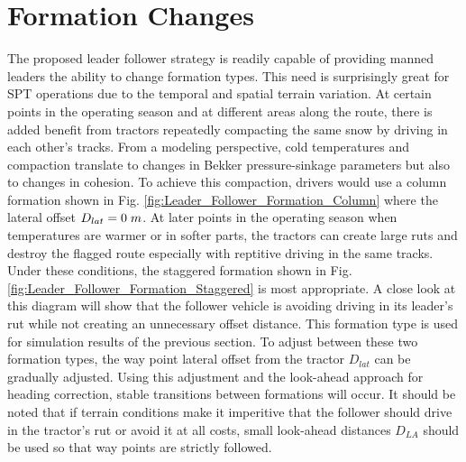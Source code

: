\section{Formation Changes}
The proposed leader follower strategy is readily capable of providing manned leaders the ability to change formation types. This need is surprisingly great for SPT operations due to the temporal and spatial terrain variation. At certain points in the operating season and at different areas along the route, there is added benefit from tractors repeatedly compacting the same snow by driving in each other's tracks. From a modeling perspective, cold temperatures and compaction translate to changes in Bekker pressure-sinkage parameters but also to changes in cohesion. To achieve this compaction, drivers would use a column formation shown in Fig. \ref{fig:Leader_Follower_Formation_Column} where the lateral offset $D_{lat} = 0\hspace{1mm}m$. At later points in the operating season when temperatures are warmer or in softer parts, the tractors can create large ruts and destroy the flagged route especially with reptitive driving in the same tracks. Under these conditions, the staggered formation shown in Fig. \ref{fig:Leader_Follower_Formation_Staggered} is most appropriate. A close look at this diagram will show that the follower vehicle is avoiding driving in its leader's rut while not creating an unnecessary offset distance. This formation type is used for simulation results of the previous section. To adjust between these two formation types, the way point lateral offset from the tractor $D_{lat}$ can be gradually adjusted. Using this adjustment and the look-ahead approach for heading correction, stable transitions between formations will occur. It should be noted that if terrain conditions make it imperitive that the follower should drive in the tractor's rut or avoid it at all costs, small look-ahead distances $D_{LA}$ should be used so that way points are strictly followed.

